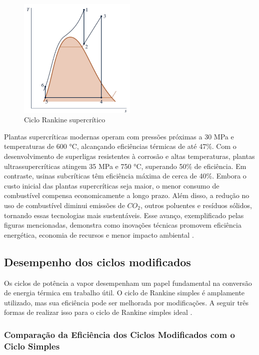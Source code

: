 \documentclass[
	article,			%
	11pt,				%
	oneside,			%
	a4paper,			%
	english,			%
	brazil,				%
	sumario=tradicional
	]{abntex2}
\begin{document}
\begin{figure}[h]
	\centering
	\includegraphics[width=0.5\textwidth]{./images/supercritico.png}
	\caption{Ciclo Rankine supercrítico}
	\label{fig:supercritico}
\end{figure}

Plantas supercríticas modernas operam com pressões próximas a 30 MPa e temperaturas de 600 °C, alcançando eficiências térmicas de até 47\%. Com o desenvolvimento de superligas resistentes à corrosão e altas temperaturas, plantas ultrassupercríticas atingem 35 MPa e 750 °C, superando 50\% de eficiência. Em contraste, usinas subcríticas têm eficiência máxima de cerca de 40\%. Embora o custo inicial das plantas supercríticas seja maior, o menor consumo de combustível compensa economicamente a longo prazo. Além disso, a redução no uso de combustível diminui emissões de $CO_2$, outros poluentes e resíduos sólidos, tornando essas tecnologias mais sustentáveis. Esse avanço, exemplificado pelas figuras mencionadas, demonstra como inovações técnicas promovem eficiência energética, economia de recursos e menor impacto ambiental \cite{moran-2018}.

\subsection{Desempenho dos ciclos modificados}

Os ciclos de potência a vapor desempenham um papel fundamental na conversão de energia térmica em trabalho útil. O ciclo de Rankine simples é amplamente utilizado, mas sua eficiência pode ser melhorada por modificações. A seguir três formas de realizar isso para o ciclo de Rankine simples ideal \cite{cengel-2008}.

\subsubsection{Comparação da Eficiência dos Ciclos Modificados com o Ciclo Simples}
\end{document}
